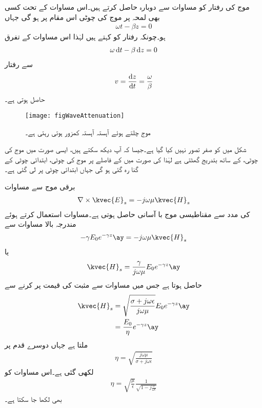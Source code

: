 موج کی رفتار کو مساوات  سے دوبارہ حاصل کرتے ہیں۔اس مساوات کے تحت کسی بھی لمحہ  پر موج کی چوٹی اس مقام پر ہو گی جہاں
\begin{align*}
\omega t -\beta z=0
\end{align*}
ہو۔چونکہ رفتار  کو کہتے ہیں لہٰذا اس مساوات کے تفرق
\begin{align*}
\omega \dif t-\beta \dif z=0
\end{align*}
سے رفتار
\begin{align}
v=\frac{\dif z}{\dif t}=\frac{\omega}{\beta}
\end{align}
حاصل ہوتی ہے۔

\begin{figure}
\centering
\texttt{[image: figWaveAttenuation]}
\caption{موج چلتے ہوئے آہستہ آہستہ کمزور ہوتی رہتی ہے۔}
\label{شکل_موج_کمزوری}
\end{figure}

شکل  میں  کو صفر تصور نہیں کیا گیا ہے۔جیسا کہ آپ دیکھ سکتے ہیں، ایسی صورت میں موج کی چوٹی،  کے ساتھ بتدریج گھٹتی  ہے لہٰذا  کی صورت میں  کے فاصلے پر موج کی چوٹی، ابتدائی چوٹی کے  گنا رہ گئی ہو گی جہاں ابتدائی چوٹی  پر لی گئی ہے۔

برقی موج  سے مساوات 
\begin{align*}
\nabla \times \kvec{E}_{s}=-j \omega \mu \kvec{H}_{s}
\end{align*}
 کی مدد سے مقناطیسی موج با آسانی حاصل ہوتی ہے۔مساوات  استعمال کرتے ہوئے مندرجہ بالا مساوات سے
\begin{align*}
-\gamma E_0 e^{-\gamma z} \ay=-j \omega \mu \kvec{H}_s
\end{align*}
یا
\begin{align*}
\kvec{H}_s=\frac{\gamma}{j \omega \mu} E_0 e^{-\gamma z} \ay
\end{align*}
حاصل ہوتا ہے جس میں مساوات  سے مثبت  کی قیمت پر کرنے سے
\begin{gather}
\begin{aligned}\label{مساوات_موج_مقناطیسی_جزو}
\kvec{H}_s&=\sqrt{\frac{\sigma +j \omega \epsilon}{j \omega \mu}} E_0 e^{-\gamma z} \ay\\
&=\frac{E_0}{\eta} e^{-\gamma z}\ay
\end{aligned}
\end{gather}
ملتا ہے جہاں دوسرے قدم پر
\begin{align}\label{مساوات-موج_قدرتی_رکاوٹ}
\eta =\sqrt{\frac{j \omega \mu}{\sigma +j \omega \epsilon}}
\end{align}
لکھی گئی ہے۔اس مساوات کو
\begin{align}\label{مساوات-موج_قدرتی_رکاوٹ_ب}
\eta =\sqrt{\frac{\mu}{\epsilon}}\frac{1}{\sqrt{1-j \frac{\sigma}{\omega \epsilon}}}
\end{align}
بھی لکھا جا سکتا ہے۔

